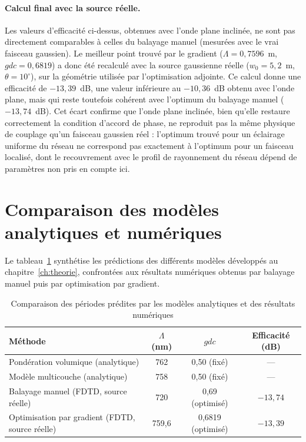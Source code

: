 \documentclass[a4paper,11pt]{report}
\begin{document}
\paragraph{Calcul final avec la source réelle.} Les valeurs d'efficacité ci-dessus, obtenues avec l'onde plane inclinée, ne sont pas directement comparables à celles du balayage manuel (mesurées avec le vrai faisceau gaussien). Le meilleur point trouvé par le gradient ($\Lambda=0{,}7596$~\textmu m, $gdc=0{,}6819$) a donc été recalculé avec la source gaussienne réelle ($w_0=5{,}2$~\textmu m, $\theta=10^\circ$), sur la géométrie utilisée par l'optimisation adjointe. Ce calcul donne une efficacité de $-13{,}39$~dB, une valeur inférieure au $-10{,}36$~dB obtenu avec l'onde plane, mais qui reste toutefois cohérent avec l'optimum du balayage manuel ($-13{,}74$~dB). Cet écart confirme que l'onde plane inclinée, bien qu'elle restaure correctement la condition d'accord de phase, ne reproduit pas la même physique de couplage qu'un faisceau gaussien réel : l'optimum trouvé pour un éclairage uniforme du réseau ne correspond pas exactement à l'optimum pour un faisceau localisé, dont le recouvrement avec le profil de rayonnement du réseau dépend de paramètres non pris en compte ici.

\section{Comparaison des modèles analytiques et numériques}

Le tableau~\ref{tab:comparaison_finale} synthétise les prédictions des différents modèles développés au chapitre~\ref{ch:theorie}, confrontées aux résultats numériques obtenus par balayage manuel puis par optimisation par gradient.

\begin{table}[h]
\centering
\begin{tabular}{lccc}
\hline
Méthode & $\Lambda$ (nm) & $gdc$ & Efficacité (dB) \\
\hline
Pondération volumique (analytique) & 762 & 0,50 (fixé) & --- \\
Modèle multicouche (analytique) & 758 & 0,50 (fixé) & --- \\
Balayage manuel (FDTD, source réelle) & 720 & 0,69 (optimisé) & $-13,74$ \\
Optimisation par gradient (FDTD, source réelle) & 759,6 & 0,6819 (optimisé) & $-13,39$ \\
\hline
\end{tabular}
\caption{Comparaison des périodes prédites par les modèles analytiques et des résultats numériques}
\label{tab:comparaison_finale}
\end{table}
\end{document}

